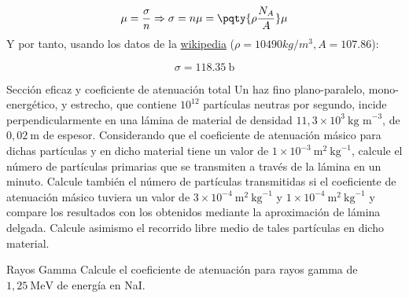 \begin{equation}
    \mu = \frac{\sigma}{n} \Rightarrow \sigma = n \mu = \pqty{\rho \frac{N_A}{A}} \mu
\end{equation}
Y por tanto, usando los datos de la \href{https://es.wikipedia.org/wiki/Plata}{wikipedia} ($\rho=10490 \unit{kg/m^3}, A=107.86$):

\begin{equation}
    \sigma = \SI{118.35}{\barn}
\end{equation}


\begin{Ejercicio}{Sección eficaz y coeficiente de atenuación total} 
    Un haz fino plano-paralelo, mono-energético, y estrecho, que contiene $10^{12}$ partículas neutras por segundo, incide perpendicularmente en una lámina de material de densidad $11,3 \times 10^{3}\ \text{kg m}^{-3}$, de $0,02\ \text{m}$ de espesor. Considerando que el coeficiente de atenuación másico para dichas partículas y en dicho material tiene un valor de $1 \times 10^{-3}\ \text{m}^2 \ \text{kg}^{-1}$, calcule el número de partículas primarias que se transmiten a través de la lámina en un minuto. Calcule también el número de partículas transmitidas si el coeficiente de atenuación másico tuviera un valor de $3 \times 10^{-4}\ \text{m}^2 \ \text{kg}^{-1}$ y $1 \times 10^{-4}\ \text{m}^2 \ \text{kg}^{-1}$ y compare los resultados con los obtenidos mediante la aproximación de lámina delgada. Calcule asimismo el recorrido libre medio de tales partículas en dicho material.
\end{Ejercicio}





\begin{Ejercicio}{Rayos Gamma}
Calcule el coeficiente de atenuación para rayos gamma de $1,25\ \text{MeV}$ de energía en NaI.
\end{Ejercicio}

